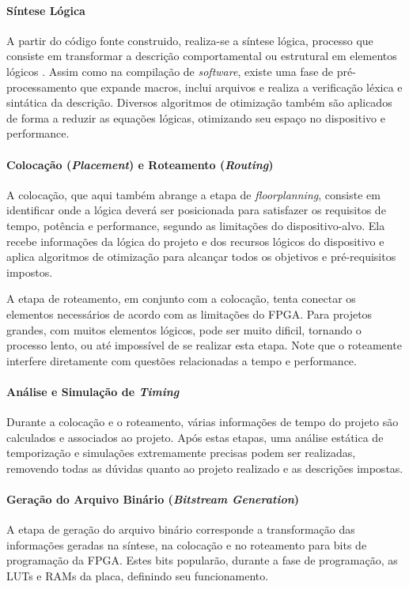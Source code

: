 \documentclass[11pt,a4paper,oneside]{book}
\begin{document}
\paragraph{Síntese Lógica}
A partir do código fonte construido, realiza-se a síntese lógica, processo que consiste em transformar a descrição comportamental ou estrutural em elementos lógicos \cite{Thomas1996, Ashenden2008}.
Assim como na compilação de \textit{software}, existe uma fase de pré-processamento que expande macros, inclui arquivos e realiza a verificação léxica e sintática da descrição.
Diversos algoritmos de otimização também são aplicados de forma a reduzir as equações lógicas, otimizando seu espaço no dispositivo e performance.

\paragraph{Colocação (\textit{Placement}) e Roteamento (\textit{Routing})}
A colocação, que aqui também abrange a etapa de \textit{floorplanning}, consiste em identificar onde a lógica deverá ser posicionada para satisfazer os requisitos de tempo, potência e performance, segundo as limitações do dispositivo-alvo.
Ela recebe informações da lógica do projeto e dos recursos lógicos do dispositivo e aplica algoritmos de otimização para alcançar todos os objetivos e pré-requisitos impostos.

A etapa de roteamento, em conjunto com a colocação, tenta conectar os elementos necessários de acordo com as limitações do FPGA.
Para projetos grandes, com muitos elementos lógicos, pode ser muito dificil, tornando o processo lento, ou até impossível de se realizar esta etapa.
Note que o roteamente interfere diretamente com questões relacionadas a tempo e performance.

\paragraph{Análise e Simulação de \textit{Timing}}
Durante a colocação e o roteamento, várias informações de tempo do projeto são calculados e associados ao projeto.
Após estas etapas, uma análise estática de temporização e simulações extremamente precisas podem ser realizadas, removendo todas as dúvidas quanto ao projeto realizado e as descrições impostas.

\paragraph{Geração do Arquivo Binário (\textit{Bitstream Generation})}
A etapa de geração do arquivo binário corresponde a transformação das informações geradas na síntese, na colocação e no roteamento para bits de programação da FPGA.
Estes bits popularão, durante a fase de programação, as LUTs e RAMs da placa, definindo seu funcionamento.
\end{document}

